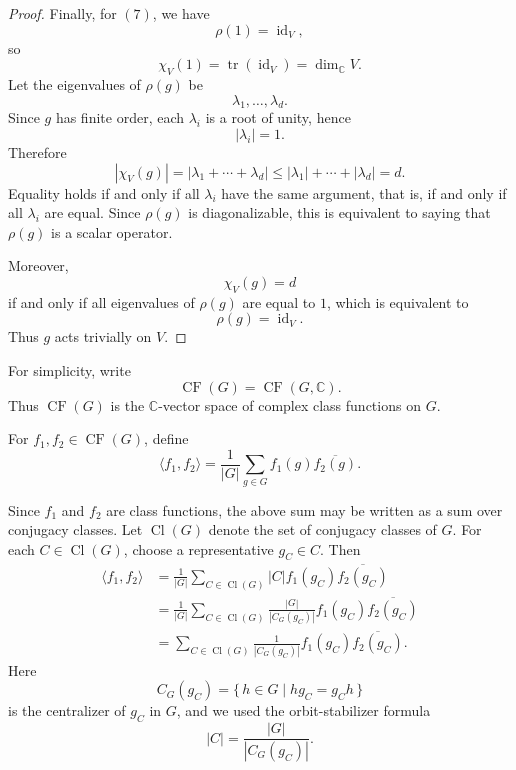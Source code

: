 \begin{proof}
    Finally, for \((7)\), we have
    \[
        \rho(1)=\operatorname{id}_V,
    \]
    so
    \[
        \chi_V(1)=\operatorname{tr}(\operatorname{id}_V)=\dim_{\mathbb{C}}V.
    \]
    Let the eigenvalues of \(\rho(g)\) be
    \[
        \lambda_1,\dots,\lambda_d.
    \]
    Since \(g\) has finite order, each \(\lambda_i\) is a root of unity, hence
    \[
        |\lambda_i|=1.
    \]
    Therefore
    \[
        |\chi_V(g)|
        =
        \left|\lambda_1+\cdots+\lambda_d\right|
        \leq
        |\lambda_1|+\cdots+|\lambda_d|
        =
        d.
    \]
    Equality holds if and only if all \(\lambda_i\) have the same argument, that is,
    if and only if all \(\lambda_i\) are equal. Since \(\rho(g)\) is diagonalizable,
    this is equivalent to saying that \(\rho(g)\) is a scalar operator.

    Moreover,
    \[
        \chi_V(g)=d
    \]
    if and only if all eigenvalues of \(\rho(g)\) are equal to \(1\), which is
    equivalent to
    \[
        \rho(g)=\operatorname{id}_V.
    \]
    Thus \(g\) acts trivially on \(V\).
\end{proof}

For simplicity, write
\[
    \operatorname{CF}(G)
    =
    \operatorname{CF}(G,\mathbb{C}).
\]
Thus \(\operatorname{CF}(G)\) is the \(\mathbb{C}\)-vector space of complex
class functions on \(G\).

\begin{definition}
    For \(f_1,f_2\in \operatorname{CF}(G)\), define
    \[
        \langle f_1,f_2\rangle
        =
        \frac{1}{|G|}
        \sum_{g\in G}
        f_1(g)\overline{f_2(g)}.
    \]
\end{definition}

Since \(f_1\) and \(f_2\) are class functions, the above sum may be written as
a sum over conjugacy classes. Let \(\operatorname{Cl}(G)\) denote the set of
conjugacy classes of \(G\). For each \(C\in \operatorname{Cl}(G)\), choose a
representative \(g_C\in C\). Then
\[
    \begin{aligned}
        \langle f_1,f_2\rangle
         & =
        \frac{1}{|G|}
        \sum_{C\in \operatorname{Cl}(G)}
        |C| f_1(g_C)\overline{f_2(g_C)} \\
         & =
        \frac{1}{|G|}
        \sum_{C\in \operatorname{Cl}(G)}
        \frac{|G|}{|C_G(g_C)|}
        f_1(g_C)\overline{f_2(g_C)}     \\
         & =
        \sum_{C\in \operatorname{Cl}(G)}
        \frac{1}{|C_G(g_C)|}
        f_1(g_C)\overline{f_2(g_C)}.
    \end{aligned}
\]
Here
\[
    C_G(g_C)
    =
    \{\,h\in G\mid hg_C=g_Ch\,\}
\]
is the centralizer of \(g_C\) in \(G\), and we used the orbit-stabilizer formula
\[
    |C|
    =
    \frac{|G|}{|C_G(g_C)|}.
\]

